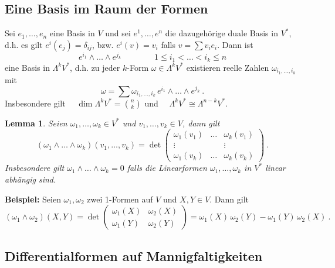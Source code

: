 \documentclass[12pt,a4paper]{article}
\newtheorem{Lemma}{Lemma}[section]
\begin{document}
\bigskip

\subsection{Eine Basis im Raum der Formen}

\bigskip

Sei $e_1, \ldots, e_n$ eine Basis in $V$ und sei $e^1, \ldots, e^n$ die dazugeh\"orige duale
Basis in $V^*$, d.h. es gilt $e^i (e_j) = \delta_{ij}$, bzw. $e^i(v) = v_i $ falls
$v = \sum v_i e_i$. Dann ist
$$
e^{i_1} \wedge \ldots \wedge e^{j_k} \qquad \qquad 1 \le i_1 < \ldots < i_k \le n
$$
eine Basis in $\Lambda^k V^*$, d.h. zu jeder $k$-Form $\omega \in \Lambda^k V^*$ existieren
reelle Zahlen $\omega_{i_1, \ldots, i_k}$ mit
$$
\omega = \sum \omega_{i_1, \ldots, i_k} \,e^{i_1} \wedge \ldots \wedge e^{j_k} \ .
$$
Insbesondere gilt $\quad \dim \Lambda^k V^* = {n \choose k}$ und
$\quad \Lambda^k V^* \cong \Lambda^{n-k} V^*$.

\bigskip

\begin{Lemma}
Seien $\omega_1, \ldots, \omega_k \in V^*$ und $v_1, \ldots, v_k \in V$, dann gilt
$$
(\omega_1 \wedge \ldots \wedge \omega_k)(v_1, \ldots, v_k)
=
\det
\left(
\begin{array}{ccc}
\omega_1(v_1)  & \dots & \omega_k(v_1) \\
\vdots         & & \vdots\\
\omega_1(v_k)  & \dots & \omega_k(v_k)
\end{array}
\right) \ .
$$
Insbesondere gilt $\omega_1 \wedge \ldots \wedge \omega_k= 0$ falls die Linearformen
$\omega_1, \ldots, \omega_k$ in $V^*$ linear abh\"angig sind.
\end{Lemma}

\bigskip

{\bf Beispiel:}
Seien $\omega_1, \omega_2$ zwei 1-Formen auf $V$ und $X,Y\in V$. Dann gilt
$$
(\omega_1 \wedge \omega_2)(X,Y) =
\det
\left(
\begin{array}{cc}
\omega_1(X)  & \omega_2(X) \\
\omega_1(Y)  & \omega_2(Y)
\end{array}
\right)
=
\omega_1(X)\,\omega_2(Y) - \omega_1(Y)\,\omega_2(X)
\ .
$$

\bigskip

\subsection{Differentialformen auf Mannigfaltigkeiten}
\end{document}
